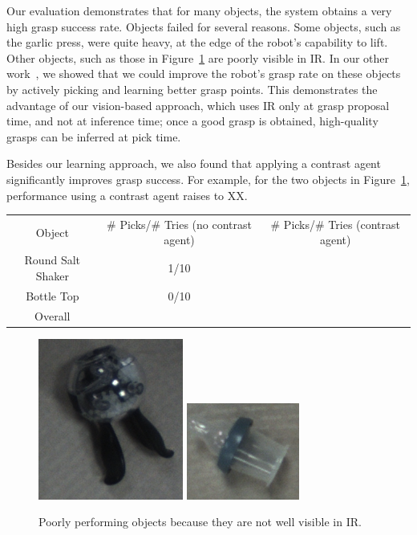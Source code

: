 \documentclass[graybox]{svmult}
\begin{document}
Our evaluation demonstrates that for many objects, the system obtains
a very high grasp success rate.  Objects failed for several reasons.
Some objects, such as the garlic press, were quite heavy, at the edge
of the robot's capability to lift.  Other objects, such as those in
Figure~\ref{fig:poor_ir} are poorly visible in IR.  In our other
work~\citep{oberlin15}, we showed that we could improve the robot's
grasp rate on these objects by actively picking and learning better
grasp points.  This demonstrates the advantage of our vision-based
approach, which uses IR only at grasp proposal time, and not at
inference time; once a good grasp is obtained, high-quality grasps can
be inferred at pick time.

Besides our learning approach, we also found that applying a contrast
agent significantly improves grasp success.  For example, for the two
objects in Figure~\ref{fig:poor_ir}, performance using a contrast
agent raises to XX.

\begin{table}
\begin{tabular}{ccc}
Object		    & \# Picks/\# Tries (no contrast agent) &\# Picks/\# Tries (contrast agent)\\
Round Salt Shaker   & 1/10  & \\
Bottle Top    	    & 0/10  & \\
\midrule
Overall             &       &\\
\bottomrule
\end{tabular}
\end{table}

\begin{figure}
\includegraphics[width=0.3\linewidth]{figures/saltshaker.png}
\includegraphics[width=0.3\linewidth]{figures/bottletop.png}
\caption{Poorly performing objects because they are not well visible
  in IR.\label{fig:poor_ir}}
\end{figure}
\end{document}
